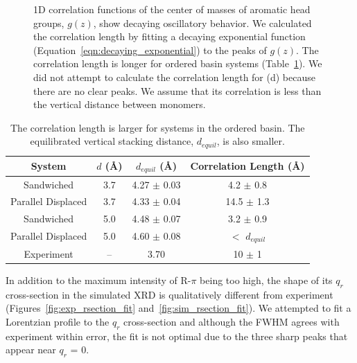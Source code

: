 \documentclass[journal=jpcbfk,manuscript=article]{achemso}
\begin{document}
\begin{figure}[!htb]
  \caption{1D correlation functions of the center of masses of aromatic head
	  groups, $g(z)$, show decaying oscillatory behavior. We calculated the
	  correlation length by fitting a decaying exponential function
	  (Equation~\ref{eqn:decaying_exponential}) to the peaks of $g(z)$. The
	  correlation length is longer for ordered basin systems
	  (Table~\ref{table:correlation_length}). We did not attempt to calculate the
	  correlation length for (d) because there are no clear peaks. We assume that its
	  correlation is less than the vertical distance between monomers.}\label{fig:correlation}
  \end{figure}  
  
  \begin{table}[h]
  \centering
  \begin{tabular}{cccc}
  \toprule
  System             & $\mathit{d}$ (\AA) & $\mathit{d}_{equil}$ (\AA) & Correlation Length (\AA) \\
  \midrule
  Sandwiched         & 3.7                &    4.27 $\pm$ 0.03         & 4.2 $\pm$ 0.8            \\
  Parallel Displaced & 3.7                &    4.33 $\pm$ 0.04         & 14.5 $\pm$ 1.3           \\ 
  Sandwiched         & 5.0                &    4.48 $\pm$ 0.07         & 3.2 $\pm$ 0.9            \\
  Parallel Displaced & 5.0                &    4.60 $\pm$ 0.08         & $<$ $d_{equil}$ \\ 
  Experiment         & --                 &    3.70                    & 10 $\pm$ 1               \\
  \bottomrule
  \end{tabular}
  \caption{The correlation length is larger for systems in the ordered basin. The equilibrated vertical
  stacking distance, $\mathit{d}_{equil}$, is also smaller.}
  \label{table:correlation_length}
  \end{table}

  In addition to the maximum intensity of R-$\pi$ being too high, the shape
  of its $q_r$ cross-section in the simulated XRD is qualitatively different
  from experiment (Figures~\ref{fig:exp_rsection_fit}
  and~\ref{fig:sim_rsection_fit}). We attempted to fit a Lorentzian profile to 
  the $q_r$ cross-section and although the FWHM agrees with experiment within
  error, the fit is not optimal due to the three sharp peaks that appear near
  $q_r$ = 0. 
  
\end{document}
